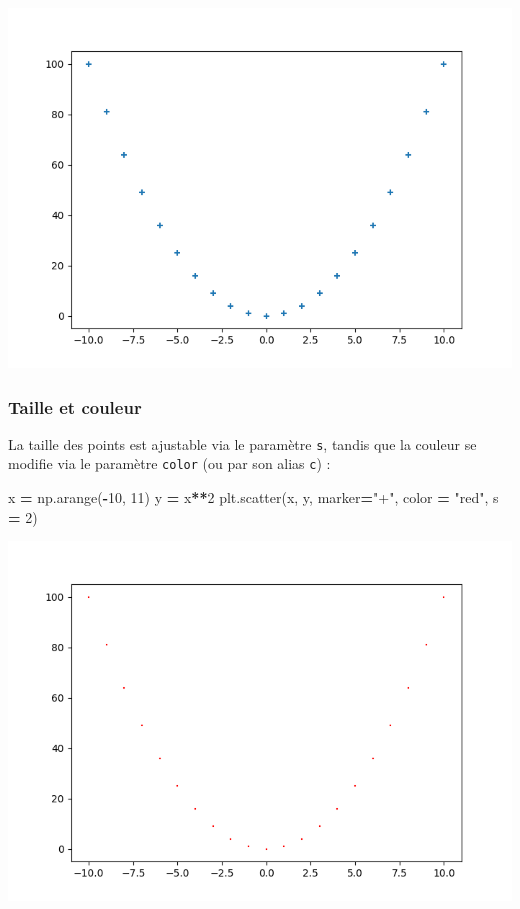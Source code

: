\documentclass[
  12pt,
]{book}
\newenvironment{Shaded}{\begin{snugshade}}{\end{snugshade}}
\newcommand{\DecValTok}[1]{\textcolor[rgb]{0.00,0.00,0.81}{#1}}
\newcommand{\NormalTok}[1]{#1}
\newcommand{\OperatorTok}[1]{\textcolor[rgb]{0.81,0.36,0.00}{\textbf{#1}}}
\newcommand{\StringTok}[1]{\textcolor[rgb]{0.31,0.60,0.02}{#1}}
\numberwithin{equation}{section}
\numberwithin{countremarque}{section}
\begin{document}
\begin{center}\includegraphics[width=9.03in]{figs/pyplot/scatter_2} \end{center}

\subsubsection{Taille et couleur}\label{taille-et-couleur}

La taille des points est ajustable via le paramètre \texttt{s}, tandis que la couleur se modifie via le paramètre \texttt{color} (ou par son alias \texttt{c}) :

\begin{Shaded}
\begin{Highlighting}[]
\NormalTok{x }\OperatorTok{=}\NormalTok{ np.arange(}\OperatorTok{{-}}\DecValTok{10}\NormalTok{, }\DecValTok{11}\NormalTok{)}
\NormalTok{y }\OperatorTok{=}\NormalTok{ x}\OperatorTok{**}\DecValTok{2}
\NormalTok{plt.scatter(x, y, marker}\OperatorTok{=}\StringTok{"+"}\NormalTok{, color }\OperatorTok{=} \StringTok{"red"}\NormalTok{, s }\OperatorTok{=} \DecValTok{2}\NormalTok{)}
\end{Highlighting}
\end{Shaded}

\begin{center}\includegraphics[width=9.03in]{figs/pyplot/scatter_3} \end{center}
\end{document}
